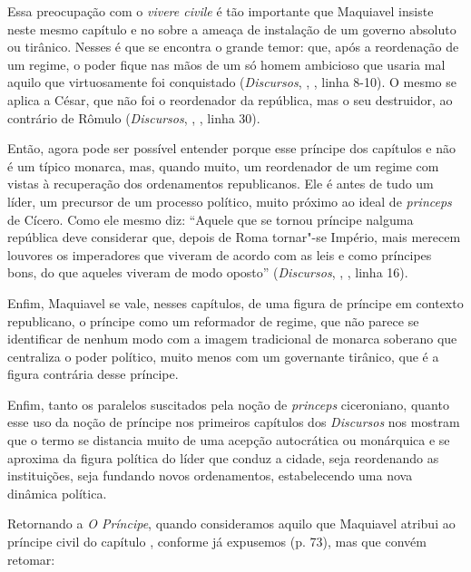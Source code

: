 Essa preocupação com o \emph{vivere civile} é tão importante que
Maquiavel insiste neste mesmo capítulo  e no  sobre a ameaça de
instalação de um governo absoluto ou tirânico. Nesses é que se encontra
o grande temor: que, após a reordenação de um regime, o poder fique nas
mãos de um só homem ambicioso que usaria mal aquilo que virtuosamente
foi conquistado (\emph{Discursos}, , , linha 8-10). O mesmo se aplica
a César, que não foi o reordenador da república, mas o seu destruidor,
ao contrário de Rômulo (\emph{Discursos}, , , linha 30).

Então, agora pode ser possível entender porque esse príncipe dos
capítulos  e  não é um típico monarca, mas, quando muito, um
reordenador de um regime com vistas à recuperação dos ordenamentos
republicanos. Ele é antes de tudo um líder, um precursor de um processo
político, muito próximo ao ideal de \emph{princeps} de Cícero. Como ele
mesmo diz: ``Aquele que se tornou príncipe nalguma república deve
considerar que, depois de Roma tornar"-se Império, mais merecem louvores
os imperadores que viveram de acordo com as leis e como príncipes bons,
do que aqueles viveram de modo oposto'' (\emph{Discursos}, , , linha
16).

Enfim, Maquiavel se vale, nesses capítulos, de uma figura de príncipe em
contexto republicano, o príncipe como um reformador de regime, que não
parece se identificar de nenhum modo com a imagem tradicional de monarca
soberano que centraliza o poder político, muito menos com um governante
tirânico, que é a figura contrária desse príncipe.

Enfim, tanto os paralelos suscitados pela noção de \emph{princeps}
ciceroniano, quanto esse uso da noção de príncipe nos primeiros
capítulos dos \emph{Discursos} nos mostram que o termo se distancia
muito de uma acepção autocrática ou monárquica e se aproxima da figura
política do líder que conduz a cidade, seja reordenando as instituições,
seja fundando novos ordenamentos, estabelecendo uma nova dinâmica
política.

Retornando a \emph{O Príncipe}, quando consideramos aquilo que
Maquiavel atribui ao príncipe civil do capítulo , conforme já
expusemos (p. 73), mas que convém retomar:

